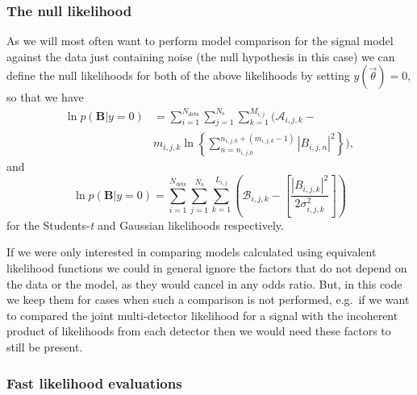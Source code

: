 \subsubsection{The null likelihood}

As we will most often want to perform model comparison for the signal model against the data just containing
noise (the null hypothesis in this case) we can define the null likelihoods for both of the above likelihoods
by setting $y(\vec{\theta}) = 0$, so that we have
\begin{align}\label{eq:nulllike}
\ln{p(\mathbf{B}|y=0)} &= \sum_{i=1}^{N_{\text{dets}}} \sum_{j=1}^{N_{\text{s}}}
\sum_{k=1}^{M_{i,j}} \Bigg( \mathcal{A}_{i,j,k} - \nonumber \\
&m_{i,j,k}\ln{
\left\{\sum_{n=n_{i,j,0}}^{n_{i,j,0}+(m_{i,j,k}-1)} |B_{i,j,n}|^2\right\}}
\Bigg),
\end{align}
and
\begin{equation}
\ln{p(\mathbf{B}|y=0)} = \sum_{i=1}^{N_{\text{dets}}} \sum_{j=1}^{N_{\text{s}}}
\sum_{k=1}^{L_{i,j}} \left(\mathcal{B}_{i,j,k} -
\left[\frac{|B_{i,j,k}|^2}{2\sigma_{i,j,k}^2 } \right] \right)
\end{equation}
for the Students-{\it t} and Gaussian likelihoods respectively.

If we were only interested in comparing models calculated using equivalent likelihood functions we could in
general ignore the factors that do not depend on the data or the model, as they would cancel in any odds
ratio. But, in this code we keep them for cases when such a comparison is not performed, e.g.\ if we
want to compared the joint multi-detector likelihood for a signal with the incoherent product of likelihoods
from each detector then we would need these factors to still be present.

\subsubsection{Fast likelihood evaluations}\label{sec:fastlike}

